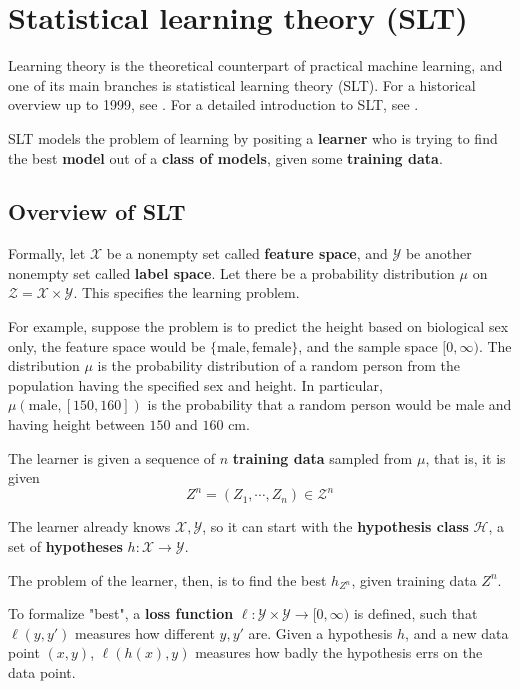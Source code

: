 \section{Statistical learning theory (SLT)}
Learning theory is the theoretical counterpart of practical machine learning, and one of its main branches is statistical learning theory (SLT). For a historical overview up to 1999, see \cite[Introduction]{vapnikNatureStatisticalLearning2000}. For a detailed introduction to SLT, see \cite{bousquetIntroductionStatisticalLearning2003}.

SLT models the problem of learning by positing a \textbf{learner} who is trying to find the best \textbf{model} out of a \textbf{class of models}, given some \textbf{training data}.

\subsection{Overview of SLT}
Formally, let $\mathcal{X}$ be a nonempty set called \textbf{feature space}, and $\mathcal{Y}$ be another nonempty set called \textbf{label space}. Let there be a probability distribution $\mu$ on $\mathcal{Z} = \mathcal{X}\times\mathcal{Y}$. This specifies the learning problem.

For example, suppose the problem is to predict the height based on biological sex only, the feature space would be $\{\text{male}, \text{female}\}$, and the sample space $[0, \infty)$. The distribution $\mu$ is the probability distribution of a random person from the population having the specified sex and height. In particular, $\mu(\text{male}, [150, 160])$ is the probability that a random person would be male and having height between $150$ and $160$ cm.

The learner is given a sequence of $n$ \textbf{training data} sampled from $\mu$, that is, it is given 
$$Z^n = (Z_1, \cdots, Z_n) \in \mathcal{Z}^n$$

The learner already knows $\mathcal{X}, \mathcal{Y}$, so it can start with the \textbf{hypothesis class} $\mathcal{H}$, a set of \textbf{hypotheses} $h: \mathcal{X}\to \mathcal{Y}$. 

The problem of the learner, then, is to find the best $h_{Z^n}$, given training data $Z^n$.

To formalize "best", a \textbf{loss function} $\ell: \mathcal{Y} \times \mathcal{Y} \to [0, \infty)$ is defined, such that $\ell(y, y')$ measures how different $y, y'$ are. Given a hypothesis $h$, and a new data point $(x, y)$, $\ell(h(x), y)$ measures how badly the hypothesis errs on the data point. 

